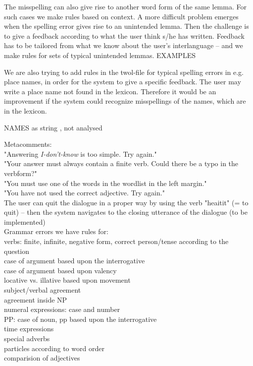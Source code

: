\documentclass[11pt]{article}
\begin{document}
The misspelling can also give rise to another word form of the same lemma. For such cases we make rules based on context. A more difficult problem emerges when the spelling error gives rise to an unintended lemma. Then the challenge is to give a feedback according to what the user think s/he has written. Feedback has to be tailored from what we know about the user’s interlanguage – and we make rules for sets of typical unintended lemmas. EXAMPLES

We are also trying to add rules in the twol-file for typical spelling errors in e.g. place names, in order for the system to give a specific feedback. The user may write a place name not found in the lexicon. Therefore it would be an improvement if the system could recognize misspellings of the names, which are in the lexicon.

NAMES as string , not analysed

Metacomments:\\
"Answering \textit{I-don't-know} is too simple. Try again."\\
"Your answer must always contain a finite verb. Could there be a typo in the verbform?"\\
"You must use one of the words in the wordlist in the left margin."\\
"You have not used the correct adjective. Try again." \\
The user can quit the dialogue in a proper way by using the verb "heaitit" (= to quit) -- then the system navigates to the closing utterance of the dialogue (to be implemented)\\

Grammar errors we have rules for:\\
verbs: finite, infinite, negative form, correct person/tense according to the question\\
case of argument based upon the interrogative \\
case of argument based upon valency\\
locative vs. illative based upon movement\\
subject/verbal agreement\\
agreement inside NP \\
numeral expressions: case and number  \\
PP: case of noun, pp based upon the interrogative \\ 
time expressions \\
special adverbs  \\
particles according to word order \\
comparision of adjectives\\
\end{document}
